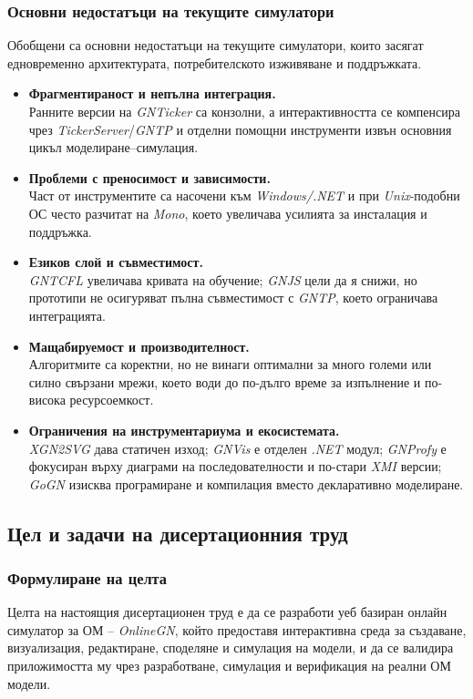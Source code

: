 \subsubsection{Основни недостатъци на текущите симулатори}

\hspace*{2.5em}Обобщени са основни недостатъци на текущите симулатори, които засягат едновременно архитектурата, потребителското изживяване и поддръжката.

\begin{itemize}
    \item \textbf{Фрагментираност и непълна интеграция.}\\
    Ранните версии на \textit{GNTicker} са конзолни, а интерактивността се компенсира чрез \textit{TickerServer}/\textit{GNTP} и отделни помощни инструменти извън основния цикъл моделиране--симулация.
    \item \textbf{Проблеми с преносимост и зависимости.}\\
    Част от инструментите са насочени към \textit{Windows/.NET} и при \textit{Unix}-подобни ОС често разчитат на \textit{Mono}, което увеличава усилията за инсталация и поддръжка.
    \item \textbf{Езиков слой и съвместимост.}\\
    \textit{GNTCFL} увеличава кривата на обучение; \textit{GNJS} цели да я снижи, но прототипи не осигуряват пълна съвместимост с \textit{GNTP}, което ограничава интеграцията.
    \item \textbf{Мащабируемост и производителност.}\\
    Алгоритмите са коректни, но не винаги оптимални за много големи или силно свързани мрежи, което води до по-дълго време за изпълнение и по-висока ресурсоемкост.
    \item \textbf{Ограничения на инструментариума и екосистемата.}\\
    \textit{XGN2SVG} дава статичен изход; \textit{GNVis} е отделен \textit{.NET} модул; \textit{GNProfy} е фокусиран върху диаграми на последователности и по-стари \textit{XMI} версии; \textit{GoGN} изисква програмиране и компилация вместо декларативно моделиране.
\end{itemize}
\subsection{Цел и задачи на дисертационния труд}

\subsubsection{Формулиране на целта}
\hspace*{2.5em}Целта на настоящия дисертационен труд е да се разработи уеб базиран онлайн симулатор за ОМ -- \textit{OnlineGN}, който предоставя интерактивна среда за създаване, визуализация, редактиране, споделяне и симулация на модели, и да се валидира приложимостта му чрез разработване, симулация и верификация на реални ОМ модели.

